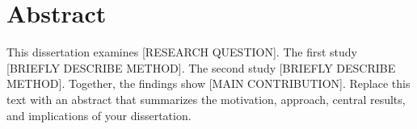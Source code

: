 \chapter*{Abstract}

This dissertation examines [RESEARCH QUESTION]. The first study [BRIEFLY DESCRIBE METHOD]. The second study [BRIEFLY DESCRIBE METHOD]. Together, the findings show [MAIN CONTRIBUTION]. Replace this text with an abstract that summarizes the motivation, approach, central results, and implications of your dissertation.
